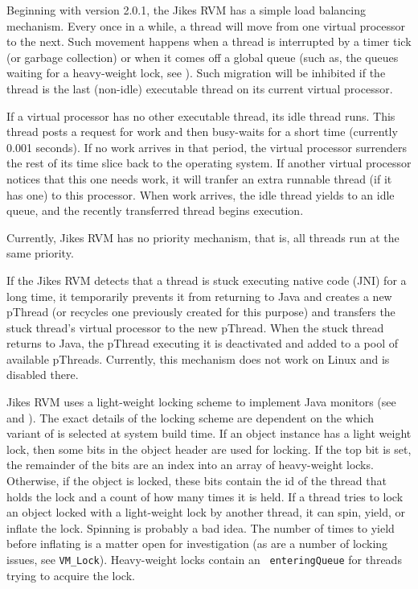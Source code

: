Beginning with version 2.0.1, the Jikes RVM has a simple load balancing
mechanism. Every once in a while, a thread will move from one virtual
processor to the next.  Such movement happens when a thread is
interrupted by a timer tick (or garbage collection) or when it comes
off a global queue (such as, the queues waiting for a heavy-weight
lock, see ).  Such migration will be
inhibited if the thread is the last (non-idle) executable thread on
its current virtual processor.  

If a virtual processor has no other executable thread, its idle thread
runs.  This thread posts a request for work and then busy-waits for a
short time (currently 0.001 seconds).  If no work arrives in that
period, the virtual processor surrenders the rest of its time slice
back to the operating system.  If another virtual processor notices
that this one needs work, it will tranfer an extra runnable thread (if
it has one) to this processor.  When work arrives, the idle thread
yields to an idle queue, and the recently transferred thread begins
execution.

Currently, Jikes RVM has no priority mechanism, that is, all threads run at
the same priority.

If the Jikes RVM detects that a thread is stuck executing native code (JNI)
for a long time, it temporarily prevents it from returning to Java and
creates a new pThread (or recycles one previously created for this 
purpose) and transfers the stuck thread's virtual processor to the
new pThread.  When the stuck thread returns to Java, the pThread
executing it is deactivated and added to a pool of available pThreads.
Currently, this mechanism does not work on Linux and is disabled there.

Jikes RVM uses a light-weight locking scheme to implement Java monitors (see
 and 
). The exact details of the
locking scheme are dependent on the which variant of 
 is selected at
system build time.  If an object instance has a light weight lock,
then some bits in the object header are used for locking.  
If the top bit is set, the remainder of the bits 
are an index into an array of heavy-weight locks.
Otherwise, if the object is locked, these bits contain the id of the
thread that holds the lock and a count of how many times it is held.
If a thread tries to lock an object locked with a light-weight lock by
another thread, it can spin, yield, or inflate the lock.  Spinning is
probably a bad idea.  The number of times to yield before inflating is
a matter open for investigation (as are a number of locking
issues, see {\tt VM\_Lock}).  Heavy-weight locks contain an {\tt
enteringQueue} for threads trying to acquire the lock.

